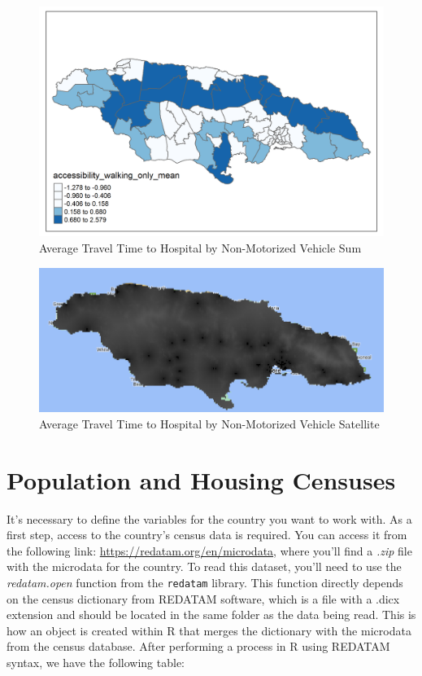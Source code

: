 \documentclass[
  12pt,
]{book}
\begin{document}
\begin{figure}
\centering
\includegraphics{Recursos/01_Session1/16_accessibility_walking_only_mean.png}
\caption{Average Travel Time to Hospital by Non-Motorized Vehicle Sum}
\end{figure}

\begin{figure}
\centering
\includegraphics{Recursos/01_Session1/17_Distancia_Hospitales_caminando.PNG}
\caption{Average Travel Time to Hospital by Non-Motorized Vehicle Satellite}
\end{figure}

\hypertarget{population-and-housing-censuses}{%
\section{Population and Housing Censuses}\label{population-and-housing-censuses}}

It's necessary to define the variables for the country you want to work with. As a first step, access to the country's census data is required. You can access it from the following link: \url{https://redatam.org/en/microdata}, where you'll find a \emph{.zip} file with the microdata for the country. To read this dataset, you'll need to use the \emph{redatam.open} function from the \texttt{redatam} library. This function directly depends on the census dictionary from REDATAM software, which is a file with a .dicx extension and should be located in the same folder as the data being read. This is how an object is created within R that merges the dictionary with the microdata from the census database. After performing a process in R using REDATAM syntax, we have the following table:
\end{document}
